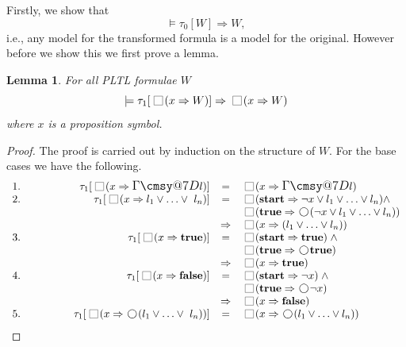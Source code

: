 \documentclass[nohyperref]{acmtrans2f}
\makeatletter
\def\sometime{\mathord{\hbox{\large$\mathchar"0\cmsy@7D$}}}
\newcommand{\always}{\raisebox{-.2ex}{
                           \mbox{\unitlength=0.9ex
                           \begin{picture}(2,2)
                           \linethickness{0.06ex}
                           \put(0,0){\line(1,0){2}}
                           \put(0,2){\line(1,0){2}}
                           \put(0,0){\line(0,1){2}}
                           \put(2,0){\line(0,1){2}}
                           \end{picture}}}
                          \,}
\newcommand{\next}{\!\raisebox{-.2ex}{ %
                        \mbox{\unitlength=0.9ex
                        \begin{picture}(2,2)
                        \linethickness{0.06ex}
                        \put(1,1){\circle{2}} %
                        \end{picture}}}       %
                        \,}
\let\imp=\Rightarrow
\def\ltrue{\hbox{\rm\bf true}}
\def\lfalse{\hbox{\rm\bf false}}
\def\lstart{\hbox{\rm\bf start}}
\newtheorem{seclemma}{Lemma}[section]
\makeatother
\begin{document}
Firstly, we show that
$$
\models \tau_0[W] \imp W,
$$
i.e., any model for the transformed formula is a model for the original.
However before we show this we first prove a lemma.

\begin{seclemma}
\label{sigma1}
For all PLTL formulae $W$
$$
\models \tau_1[\always(x \imp W)] \imp \always (x \imp W)
$$
where $x$ is a proposition symbol.
\end{seclemma}
\begin{proof}
The proof is carried out by induction on the structure of $W$.
For the base cases we have the following.
$$
\begin{array}{lrcl}
1. \qquad\qquad & \tau_1[\always(x \imp \sometime l)] & = & \always (x \imp \sometime l)\\
2. & \tau_1[\always(x \imp l_1 \lor \ldots \lor \ l_n)] & = & \always (\lstart \imp
\neg x \lor l_1 \lor \ldots \lor l_n) \land \\
& & & \always(\ltrue \imp \next (\neg x \lor l_1 \lor \ldots \lor l_n)) \\ 
& & \imp & \always (x \imp (l_1 \lor \ldots \lor l_n))\\
3. & \tau_1[\always(x \imp \ltrue  )] & = & \always(\lstart   \imp  \ltrue) \;
\land  \\
 &&&               \always(\ltrue   \imp  \next\ltrue)  \\
 &&\imp & \always(x \imp \ltrue) \\
%
4. & \tau_1[\always(x \imp \lfalse  )] & = & \always(\lstart   \imp  \neg x) \;
\land  \\
&&&                \always(\ltrue   \imp  \next\neg x)  \\
&&\imp& \always(x \imp \lfalse) \\
%
%
5. & \tau_1[\always(x \imp \next(l_1 \lor \ldots \lor \ l_n))] & = & \always (x \imp
\next(l_1 \lor \ldots \lor l_n))\\

\end{array}$$
\end{proof}
\end{document}
